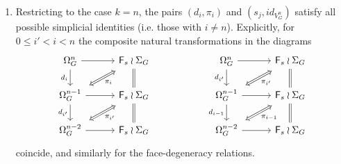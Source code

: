 \documentclass[a4paper,10pt]{article}%
\begin{document}
\begin{proposition}
\begin{enumerate}[label=(\alph*)]
\item Restricting to the case $k=n$, the pairs $(d_i,\pi_i)$ and
$(s_j,id_{V_{G}^{n}})$ satisfy all possible simplicial identities (i.e. those with $i \neq n$).
Explicitly, for $0 \leq i' < i < n$
the composite natural transformations
in the diagrams
\begin{equation}\label{SIMPPI EQ}
\begin{tikzcd}[row sep=1.7em,column sep = 3em]
	\Omega_{G}^{n} \ar{r}{} \ar{d}[swap]{d_{i}} &
	|[alias=F1]|
	\Fin_s \wr \Sigma_G \ar[equal]{d}
&&
	\Omega_{G}^{n} \ar{r}{} \ar{d}[swap]{d_{i'}} &
	|[alias=F12]|
	\Fin_s \wr \Sigma_G \ar[equal]{d}
\\
	|[alias=G2]|
	\Omega_{G}^{n-1} \ar{r}[swap]{}  \ar{d}[swap]{d_{i'}} &
	|[alias=F2]|
	\Fin_s \wr \Sigma_G \ar[equal]{d}
&&
	|[alias=G22]|
	\Omega_{G}^{n-1} \ar{r}[swap]{}  \ar{d}[swap]{d_{i-1}} &
	|[alias=F22]|
	\Fin_s \wr \Sigma_G \ar[equal]{d}
\\
	|[alias=G3]|
	\Omega_{G}^{n-2} \ar{r}{} &
	\Fin_s \wr \Sigma_G
&&
	|[alias=G32]|
	\Omega_{G}^{n-2} \ar{r}{} &
	\Fin_s \wr \Sigma_G
\arrow[Leftrightarrow, from=F1, to=G2,shorten >=0.15cm,shorten <=0.15cm,"\pi_{i}"]
\arrow[Leftrightarrow, from=F2, to=G3,shorten >=0.15cm,shorten <=0.15cm,"\pi_{i'}"]
\arrow[Leftrightarrow, from=F12, to=G22,shorten >=0.15cm,shorten <=0.15cm,"\pi_{i'}"]
\arrow[Leftrightarrow, from=F22, to=G32,shorten >=0.15cm,shorten <=0.15cm,"\pi_{i-1}"]
\end{tikzcd}
\end{equation}
coincide, and similarly for the face-degeneracy relations.
\end{enumerate}
\end{proposition}
\end{document}
